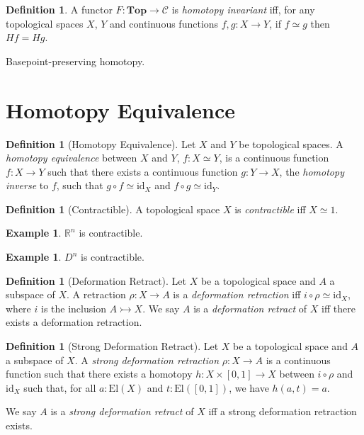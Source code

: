 \documentclass{book}
\theoremstyle{definition}
\newtheorem{df}[ax]{Definition}
\newtheorem{ex}[ax]{Example}
\newcommand{\El}[1]{\ensuremath{\mathrm{El} \left( {#1} \right)}}
\newcommand{\id}[1]{\ensuremath{\mathrm{id}_{#1}}}
\begin{document}
\begin{df}
A functor $F : \mathbf{Top} \rightarrow \mathcal{C}$ is \emph{homotopy invariant} iff, for any topological spaces $X$, $Y$ and continuous functions $f,g : X \rightarrow Y$, if $f \simeq g$ then $Hf = Hg$.
\end{df}

Basepoint-preserving homotopy.

\section{Homotopy Equivalence}

\begin{df}[Homotopy Equivalence]
Let $X$ and $Y$ be topological spaces. A \emph{homotopy equivalence} between $X$ and $Y$, $f : X \simeq Y$, is a continuous function $f : X \rightarrow Y$ such that there exists a continuous function $g : Y \rightarrow X$, the \emph{homotopy inverse} to $f$, such that $g \circ f \simeq \id{X}$ and $f \circ g \simeq \id{Y}$.
\end{df}

\begin{df}[Contractible]
A topological space $X$ is \emph{contractible} iff $X \simeq 1$.
\end{df}

\begin{ex}
$\mathbb{R}^n$ is contractible.
\end{ex}

\begin{ex}
$D^n$ is contractible.
\end{ex}

\begin{df}[Deformation Retract]
Let $X$ be a topological space and $A$ a subspace of $X$. A retraction $\rho : X \rightarrow A$ is a \emph{deformation retraction} iff $i \circ \rho \simeq \id{X}$, where $i$ is the inclusion $A \rightarrowtail X$. We say $A$ is a \emph{deformation retract} of $X$ iff there exists a deformation retraction.
\end{df}

\begin{df}[Strong Deformation Retract]
Let $X$ be a topological space and $A$ a subspace of $X$. A \emph{strong deformation retraction} $\rho : X \rightarrow A$ is a continuous function such that there exists a homotopy $h : X \times [0,1] \rightarrow X$ between $i \circ \rho$ and $\id{X}$ such that, for all $a : \El{X}$ and $t : \El{[0,1]}$, we have $h(a,t) = a$.

We say $A$ is a \emph{strong deformation retract} of $X$ iff a strong deformation retraction exists.
\end{df}
\end{document}
